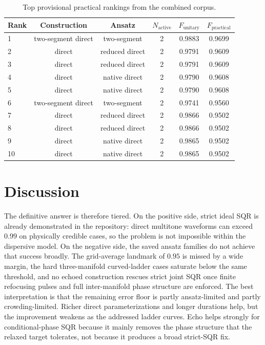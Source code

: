 \documentclass[aps,pra,twocolumn,reprint,floatfix,amsmath,amssymb]{revtex4-2}
\begin{document}
\begin{table}[t]
\scriptsize
\caption{Top provisional practical rankings from the combined corpus.}
\label{tab:ranking}
\begin{ruledtabular}
\begin{tabular}{lccccc}
Rank & Construction & Ansatz & $N_{\mathrm{active}}$ & $F_{\mathrm{unitary}}$ & $F_{\mathrm{practical}}$ \\
\midrule
1 & two-segment direct & two-segment & 2 & 0.9883 & 0.9699 \\
2 & direct & reduced direct & 2 & 0.9791 & 0.9609 \\
3 & direct & reduced direct & 2 & 0.9791 & 0.9609 \\
4 & direct & native direct & 2 & 0.9790 & 0.9608 \\
5 & direct & native direct & 2 & 0.9790 & 0.9608 \\
6 & two-segment direct & two-segment & 2 & 0.9741 & 0.9560 \\
7 & direct & reduced direct & 2 & 0.9866 & 0.9502 \\
8 & direct & reduced direct & 2 & 0.9866 & 0.9502 \\
9 & direct & native direct & 2 & 0.9865 & 0.9502 \\
10 & direct & native direct & 2 & 0.9865 & 0.9502 \\
\end{tabular}
\end{ruledtabular}
\end{table}

\section{Discussion}
The definitive answer is therefore tiered. On the positive side, strict ideal SQR is already demonstrated in the repository: direct multitone waveforms can exceed $0.99$ on physically credible cases, so the problem is not impossible within the dispersive model. On the negative side, the saved ansatz families do not achieve that success broadly. The grid-average landmark of $0.95$ is missed by a wide margin, the hard three-manifold curved-ladder cases saturate below the same threshold, and no echoed construction rescues strict joint SQR once finite refocusing pulses and full inter-manifold phase structure are enforced. The best interpretation is that the remaining error floor is partly ansatz-limited and partly crowding-limited. Richer direct parameterizations and longer durations help, but the improvement weakens as the addressed ladder curves. Echo helps strongly for conditional-phase SQR because it mainly removes the phase structure that the relaxed target tolerates, not because it produces a broad strict-SQR fix.
\end{document}
